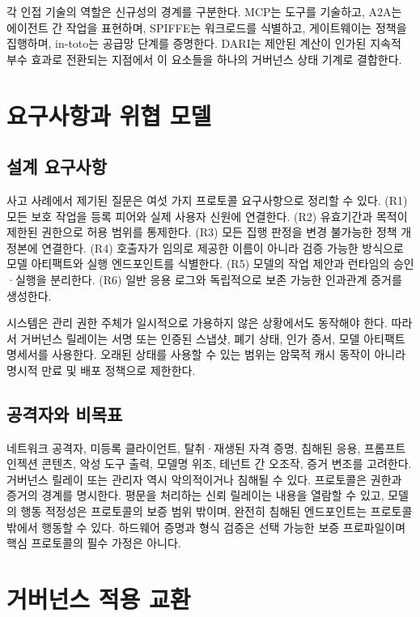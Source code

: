 \documentclass[10pt]{article}
\begin{document}
각 인접 기술의 역할은 신규성의 경계를 구분한다. MCP는 도구를 기술하고, A2A는 에이전트 간 작업을 표현하며, SPIFFE는 워크로드를 식별하고, 게이트웨이는 정책을 집행하며, in-toto는 공급망 단계를 증명한다. DARI는 제안된 계산이 인가된 지속적 부수 효과로 전환되는 지점에서 이 요소들을 하나의 거버넌스 상태 기계로 결합한다.

\section{요구사항과 위협 모델}

\subsection{설계 요구사항}

사고 사례에서 제기된 질문은 여섯 가지 프로토콜 요구사항으로 정리할 수 있다. (R1) 모든 보호 작업을 등록 피어와 실제 사용자 신원에 연결한다. (R2) 유효기간과 목적이 제한된 권한으로 허용 범위를 통제한다. (R3) 모든 집행 판정을 변경 불가능한 정책 개정본에 연결한다. (R4) 호출자가 임의로 제공한 이름이 아니라 검증 가능한 방식으로 모델 아티팩트와 실행 엔드포인트를 식별한다. (R5) 모델의 작업 제안과 런타임의 승인·실행을 분리한다. (R6) 일반 응용 로그와 독립적으로 보존 가능한 인과관계 증거를 생성한다.

시스템은 관리 권한 주체가 일시적으로 가용하지 않은 상황에서도 동작해야 한다. 따라서 거버넌스 릴레이는 서명 또는 인증된 스냅샷, 폐기 상태, 인가 증서, 모델 아티팩트 명세서를 사용한다. 오래된 상태를 사용할 수 있는 범위는 암묵적 캐시 동작이 아니라 명시적 만료 및 배포 정책으로 제한한다.

\subsection{공격자와 비목표}

네트워크 공격자, 미등록 클라이언트, 탈취·재생된 자격 증명, 침해된 응용, 프롬프트 인젝션 콘텐츠, 악성 도구 출력, 모델명 위조, 테넌트 간 오조작, 증거 변조를 고려한다. 거버넌스 릴레이 또는 관리자 역시 악의적이거나 침해될 수 있다. 프로토콜은 권한과 증거의 경계를 명시한다. 평문을 처리하는 신뢰 릴레이는 내용을 열람할 수 있고, 모델의 행동 적정성은 프로토콜의 보증 범위 밖이며, 완전히 침해된 엔드포인트는 프로토콜 밖에서 행동할 수 있다. 하드웨어 증명과 형식 검증은 선택 가능한 보증 프로파일이며 핵심 프로토콜의 필수 가정은 아니다.

\section{거버넌스 적용 교환}
\end{document}
